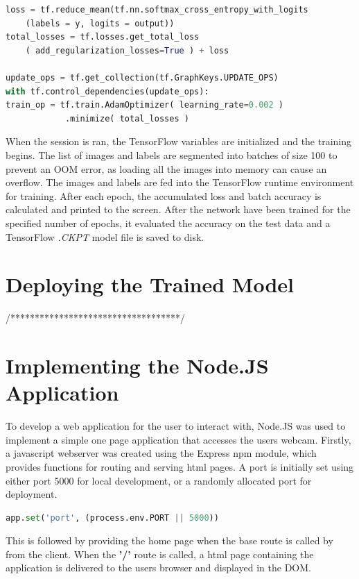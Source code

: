 \begin{lstlisting}[language=python, frame=single]
loss = tf.reduce_mean(tf.nn.softmax_cross_entropy_with_logits
    (labels = y, logits = output))
total_losses = tf.losses.get_total_loss
	( add_regularization_losses=True ) + loss

update_ops = tf.get_collection(tf.GraphKeys.UPDATE_OPS)
with tf.control_dependencies(update_ops):
train_op = tf.train.AdamOptimizer( learning_rate=0.002 )
			.minimize( total_losses )
\end{lstlisting}


When the session is ran, the TensorFlow variables are initialized and the training begins. 
The list of images and labels are segmented into batches of size 100 to prevent an OOM error, as loading all the images into memory can cause an overflow. The images and labels are fed into the TensorFlow runtime environment for training. After each epoch, the accumulated loss and batch accuracy is calculated and printed to the screen.
After the network have been trained for the specified number of epochs, it evaluated the accuracy on the test data and a TensorFlow \textit{.CKPT} model file is saved to disk.


\section{Deploying the Trained Model}

/***********************************/

\section{Implementing the Node.JS Application}
To develop a web application for the user to interact with, Node.JS was used to implement a simple one page application that accesses the users webcam. Firstly, a javascript webserver was created using the Express npm module, which provides functions for routing and serving html pages. A port is initially set using either port 5000 for local development, or a randomly allocated port for deployment. 

\begin{lstlisting}[language=python, frame=single]
	app.set('port', (process.env.PORT || 5000))
\end{lstlisting}

This is followed by providing the home page when the base route is called by from the client. When the \textbf{'/'} route is called, a html page containing the application is delivered to the users browser and displayed in the DOM.

